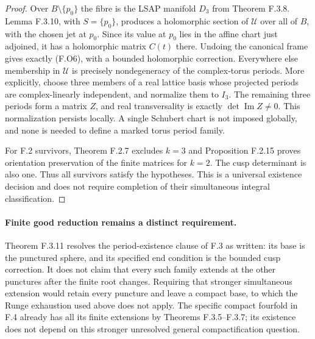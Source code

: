 \begin{proof}
Over $B\setminus\{p_0\}$ the fibre is the LSAP manifold
$D_3$ from Theorem F.3.8.  Lemma F.3.10, with $S=\{p_0\}$,
produces a holomorphic section of $\mathscr U$ over all of
$B$, with the chosen jet at $p_0$.  Since its value at $p_0$
lies in the affine chart just adjoined, it has a holomorphic
matrix $C(t)$ there.  Undoing the canonical frame gives
exactly (F.O6), with a bounded holomorphic correction.
Everywhere else membership in $\mathscr U$ is precisely
nondegeneracy of the complex-torus periods.
More explicitly, choose three members of a real lattice basis
whose projected periods are complex-linearly independent, and
normalize them to $I_3$.  The remaining three periods form a
matrix $Z$, and real transversality is exactly
$\det\operatorname{Im}Z\ne0$.  This normalization persists
locally.  A single Schubert chart is not imposed globally,
and none is needed to define a marked torus period family.

For F.2 survivors, Theorem F.2.7 excludes $k=3$ and
Proposition F.2.15 proves orientation preservation of the
finite matrices for $k=2$.  The cusp determinant is also one.
Thus all survivors satisfy the hypotheses.  This is a
universal existence decision and does not require completion
of their simultaneous integral classification.
\end{proof}

\paragraph{Finite good reduction remains a distinct requirement.}
Theorem F.3.11 resolves the period-existence clause of F.3 as
written: its base is the punctured sphere, and its specified
end condition is the bounded cusp correction.  It does not
claim that every such family extends at the other punctures
after the finite root changes.  Requiring that stronger
simultaneous extension would retain every puncture and leave
a compact base, to which the Runge exhaustion used above does
not apply.  The specific compact fourfold in F.4 already has
all its finite extensions by Theorems F.3.5--F.3.7; its
existence does not depend on this stronger unresolved general
compactification question.
